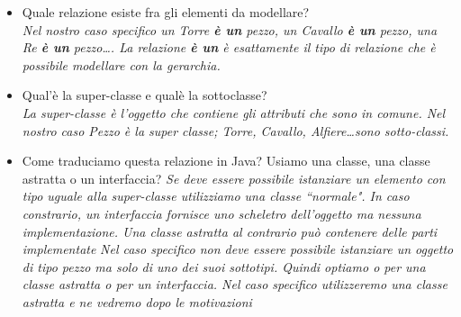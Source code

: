 \documentclass{article}
\begin{document}
\begin{itemize}
\item Quale relazione esiste fra gli elementi da modellare?\\
\textit{Nel nostro caso specifico un Torre \textbf{\`e un} pezzo, un Cavallo \textbf{\`e un} pezzo,  una Re  \textbf{\`e un} pezzo\ldots. La relazione \textbf{\`e un} \`e esattamente il tipo di relazione che \`e possibile modellare con la gerarchia.}
\item Qual'\`e la super-classe e qual\`e la sottoclasse?\\
\textit{La super-classe \`e l'oggetto che contiene gli attributi che sono in comune. Nel nostro caso Pezzo \`e la super classe; Torre, Cavallo, Alfiere\ldots sono sotto-classi.}
\item Come traduciamo questa relazione in Java? Usiamo una classe, una classe astratta o un interfaccia?
\textit{Se deve essere possibile istanziare un elemento con tipo uguale alla super-classe utilizziamo una classe ``normale". In caso constrario, un interfaccia fornisce uno scheletro dell'oggetto ma nessuna implementazione. Una classe astratta al contrario pu\`o contenere delle parti implementate}
\textit{Nel caso specifico non deve essere possibile istanziare un oggetto di tipo pezzo ma solo di uno dei suoi sottotipi. Quindi optiamo o per una classe astratta o per un interfaccia. Nel caso specifico utilizzeremo una classe astratta e ne vedremo dopo le motivazioni}
\end{itemize}
\end{document}
